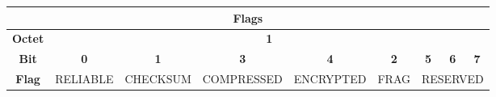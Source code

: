 \begin{table}[H]
    \centering
    \begin{tabular}{ccccccccc}
    \hline
    \multicolumn{9}{|c|}{\textbf{Flags}}                                     \\ \hline
    \multicolumn{1}{|c|}{\textbf{Octet}} & \multicolumn{8}{c|}{\textbf{1}} \\ \hline
    \multicolumn{1}{|c|}{\textbf{Bit}} &
      \multicolumn{1}{|c|}{\textbf{0}} &
      \multicolumn{1}{|c|}{\textbf{1}} &
      \multicolumn{1}{|c|}{\textbf{3}} &
      \multicolumn{1}{|c|}{\textbf{4}} &
      \multicolumn{1}{|c|}{\textbf{2}} &
      \multicolumn{1}{|c|}{\textbf{5}} &
      \multicolumn{1}{|c|}{\textbf{6}} &
      \multicolumn{1}{|c|}{\textbf{7}} \\ \hline
    \textbf{Flag} &
      \cellcolor[HTML]{FFF8DD}RELIABLE &
      \cellcolor[HTML]{FFDDDD}CHECKSUM &
      \cellcolor[HTML]{FFF8DD}COMPRESSED &
      \cellcolor[HTML]{FFDDDD}ENCRYPTED &
      \cellcolor[HTML]{FFF8DD}FRAG &
      \multicolumn{3}{c}{\cellcolor[HTML]{DDF0FF}RESERVED} \\ \hline
    \end{tabular}
\end{table}